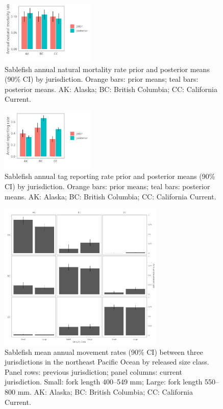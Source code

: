 \documentclass{article}
\begin{document}
\begin{figure}[htb]
    \centering
    \includegraphics[width = 0.4\textwidth]{bar-regions-3-mortality-priors-posteriors}
    \caption{Sablefish annual natural mortality rate prior and posterior means (90\% CI) by jurisdiction. Orange bars: prior means; teal bars: posterior means. AK: Alaska; BC: British Columbia; CC: California Current.}
    \label{fig:bar-regions-3-mortality-priors-posteriors}
\end{figure}

\begin{figure}[htb]
    \centering
    \includegraphics[width = 0.4\textwidth]{bar-regions-3-reporting-priors-posteriors}
    \caption{Sablefish annual tag reporting rate prior and posterior means (90\% CI) by jurisdiction. Orange bars: prior means; teal bars: posterior means. AK: Alaska; BC: British Columbia; CC: California Current.}
    \label{fig:bar-regions-3-reporting-priors-posteriors}
\end{figure}

\begin{figure}[htb]
    \centering
    \includegraphics[width = 0.7\textwidth]{bar-regions-3-size}
    \caption{Sablefish mean annual movement rates (90\% CI) between three jurisdictions in the northeast Pacific Ocean by released size class. Panel rows: previous jurisdiction; panel columns: current jurisdiction. Small: fork length 400--549 mm; Large: fork length 550--800 mm. AK: Alaska; BC: British Columbia; CC: California Current.}
    \label{fig:bar-regions-3-size}
\end{figure}
\end{document}
